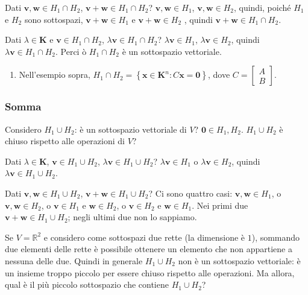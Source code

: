 \documentclass{article}
\begin{document}
Dati $\mathbf{v,w}\in H_{1}\cap H_{2}$, $\mathbf{v+w}\in H_{1}\cap H_{2}$? $%
\mathbf{v,w}\in H_{1}$, $\mathbf{v,w}\in H_{2}$, quindi, poich\'{e} $H_{1}$
e $H_{2}$ sono sottospazi, $\mathbf{v+w}\in H_{1}$ e $\mathbf{v+w}\in H_{2}$%
, quindi $\mathbf{v+w}\in H_{1}\cap H_{2}$.

Dati $\lambda \in \mathbf{K}$ e $\mathbf{v}\in H_{1}\cap H_{2}$, $\lambda 
\mathbf{v}\in H_{1}\cap H_{2}$? $\lambda \mathbf{v}\in H_{1}$, $\lambda 
\mathbf{v}\in H_{2}$, quindi $\lambda \mathbf{v}\in H_{1}\cap H_{2}$. Perci%
\`{o} $H_{1}\cap H_{2}$ \`{e} un sottospazio vettoriale.

\begin{enumerate}
\item Nell'esempio sopra, $H_{1}\cap H_{2}=\left\{ \mathbf{x}\in \mathbf{K}%
^{n}:C\mathbf{x=0}\right\} $, dove $C=\left[ 
\begin{array}{c}
A \\ 
B%
\end{array}%
\right] $.
\end{enumerate}

\subsubsection{Somma}

Considero $H_{1}\cup H_{2}$: \`{e} un sottospazio vettoriale di $V$? $%
\mathbf{0}\in H_{1},H_{2}$. $H_{1}\cup H_{2}$ \`{e} chiuso rispetto alle
operazioni di $V$?

Dati $\lambda \in \mathbf{K}$, $\mathbf{v}\in H_{1}\cup H_{2}$, $\lambda 
\mathbf{v}\in H_{1}\cup H_{2}$? $\lambda \mathbf{v}\in H_{1}$ o $\lambda 
\mathbf{v}\in H_{2}$, quindi $\lambda \mathbf{v}\in H_{1}\cup H_{2}$.

Dati $\mathbf{v,w}\in H_{1}\cup H_{2}$, $\mathbf{v+w}\in H_{1}\cup H_{2}$?
Ci sono quattro casi: $\mathbf{v,w}\in H_{1}$, o $\mathbf{v,w}\in H_{2}$, o $%
\mathbf{v}\in H_{1}$ e $\mathbf{w}\in H_{2}$, o $\mathbf{v}\in H_{2}$ e $%
\mathbf{w}\in H_{1}$. Nei primi due $\mathbf{v+w}\in H_{1}\cup H_{2}$; negli
ultimi due non lo sappiamo.

Se $V=%
\mathbb{R}
^{2}$ e considero come sottospazi due rette (la dimensione \`{e} $1$),
sommando due elementi delle rette \`{e} possibile ottenere un elemento che
non appartiene a nessuna delle due. Quindi in generale $H_{1}\cup H_{2}$ non 
\`{e} un sottospazio vettoriale: \`{e} un insieme troppo piccolo per essere
chiuso rispetto alle operazioni. Ma allora, qual \`{e} il pi\`{u} piccolo
sottospazio che contiene $H_{1}\cup H_{2}$?
\end{document}
